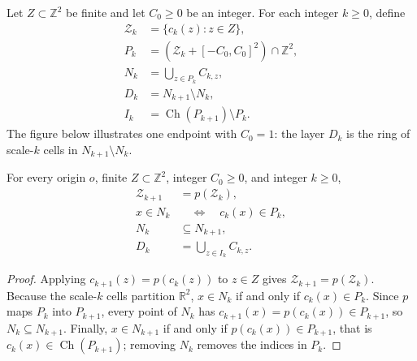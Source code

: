 \begin{definition}
    \label{def:area_law_dyadic_layers}
    \leanok
    Let $Z\subset\mathbb Z^2$ be finite and let $C_0\ge0$ be an integer.
    For each integer $k\ge0$, define
    \begin{align}
        \mathcal Z_k & =\{c_k(z):z\in Z\},                          \\
        P_k          & =(\mathcal Z_k+[-C_0,C_0]^2)\cap\mathbb Z^2, \\
        N_k          & =\bigcup_{z\in P_k}C_{k,z},                  \\
        D_k          & =N_{k+1}\setminus N_k,                       \\
        I_k          & =\operatorname{Ch}(P_{k+1})\setminus P_k.
    \end{align}
    The figure below illustrates one endpoint with $C_0=1$: the layer $D_k$ is
    the ring of scale-$k$ cells in $N_{k+1}\setminus N_k$.
    
\end{definition}

\begin{lemma}
    \label{thm:area_law_dyadic_nesting}
    \leanok
    For every origin $o$, finite $Z\subset\mathbb Z^2$, integer $C_0\ge0$,
    and integer $k\ge0$,
    \begin{align}
        \mathcal Z_{k+1} & =p(\mathcal Z_k),                            \\
        x\in N_k         & \quad\Longleftrightarrow\quad c_k(x)\in P_k, \\
        N_k              & \subseteq N_{k+1},                           \\
        D_k              & =\bigcup_{z\in I_k}C_{k,z}.
    \end{align}
\end{lemma}
\begin{proof}\leanok
    Applying $c_{k+1}(z)=p(c_k(z))$ to $z\in Z$ gives
    $\mathcal Z_{k+1}=p(\mathcal Z_k)$. Because the scale-$k$ cells partition
    $\mathbb R^2$, $x\in N_k$ if and only if $c_k(x)\in P_k$. Since $p$ maps
    $P_k$ into $P_{k+1}$, every point of $N_k$ has $c_{k+1}(x)=p(c_k(x))\in P_{k+1}$,
    so $N_k\subseteq N_{k+1}$. Finally, $x\in N_{k+1}$ if and only if
    $p(c_k(x))\in P_{k+1}$, that is $c_k(x)\in\operatorname{Ch}(P_{k+1})$;
    removing $N_k$ removes the indices in $P_k$.
\end{proof}

